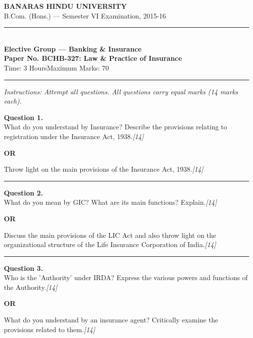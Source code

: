 \documentclass[11pt,a4paper]{article}
\newcommand{\pts}[1]{\hfill   \textit{[#1]}}
\begin{document}
\begin{center}
  {\large\bfseries BANARAS HINDU UNIVERSITY}\\[2pt]
  {\normalsize B.Com. (Hons.) --- Semester VI Examination, 2015-16}\\[6pt]
  \rule{0.8\linewidth}{0.5pt}\\[6pt]
  {\large\bfseries Elective Group --- Banking \& Insurance}\\[4pt]
  {\large\bfseries Paper No. BCHB-327: Law \& Practice of Insurance}\\[4pt]
  {\normalsize Time: 3 Hours\hfill Maximum Marks: 70}
\end{center}

\rule{\linewidth}{0.4pt}

\smallskip



\noindent   \textit{Instructions: Attempt all questions. All questions carry equal marks (14 marks each).}

\bigskip




\noindent   \textbf{Question 1.} \\
What do you understand by Insurance? Describe the provisions relating to registration under the Insurance Act, 1938.\pts{14}

\centerline{   \textbf{OR}}

Throw light on the main provisions of the Insurance Act, 1938.\pts{14}

\medskip\rule{\linewidth}{0.2pt}




\noindent   \textbf{Question 2.} \\
What do you mean by GIC? What are its main functions? Explain.\pts{14}

\centerline{   \textbf{OR}}

Discuss the main provisions of the LIC Act and also throw light on the organizational structure of the Life Insurance Corporation of India.\pts{14}

\medskip\rule{\linewidth}{0.2pt}

\pagebreak




\noindent   \textbf{Question 3.} \\
Who is the 'Authority' under IRDA? Express the various powers and functions of the Authority.\pts{14}

\centerline{   \textbf{OR}}

What do you understand by an insurance agent? Critically examine the provisions related to them.\pts{14}
\end{document}
